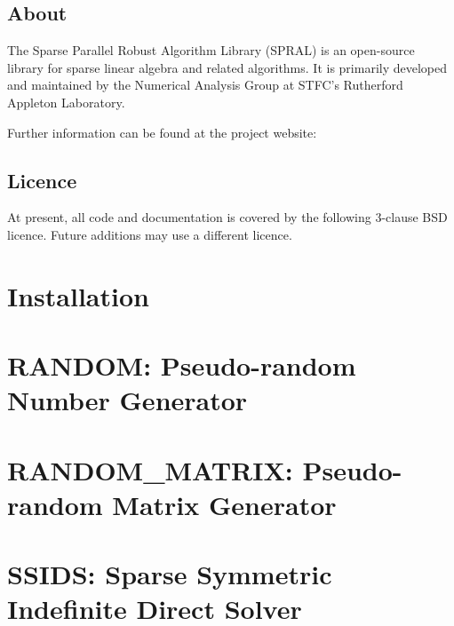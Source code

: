 \documentclass{spralweb}
\begin{document}
\tableofcontents

\let\oldthesection\thesection
\renewcommand{\thesection}{}
\section{About}
The Sparse Parallel Robust Algorithm Library (SPRAL) is an open-source library
for sparse linear algebra and related algorithms. It is primarily developed and
maintained by the Numerical Analysis Group at STFC's Rutherford Appleton Laboratory.

\noindent
Further information can be found at the project website:

\section{Licence}
At present, all code and documentation is covered by the following 3-clause BSD
licence. Future additions may use a different licence.



\renewcommand{\thesection}{\oldthesection}

\chapter{Installation}

\chapter{RANDOM: Pseudo-random Number Generator}

\chapter{RANDOM\_MATRIX: Pseudo-random Matrix Generator}

\chapter{SSIDS: Sparse Symmetric Indefinite Direct Solver}

\end{document}
